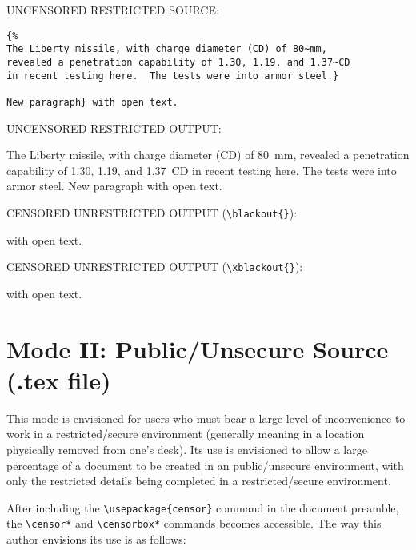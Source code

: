 \documentclass{article}
\begin{document}
{\addtolength{\leftskip}{2.3em}
UNCENSORED RESTRICTED SOURCE: \hrulefill


\verb|{%|\\
\verb|The Liberty missile, with charge diameter (CD) of 80~mm,|\\
\verb|revealed a penetration capability of 1.30, 1.19, and 1.37~CD|\\
\verb|in recent testing here.  The tests were into armor steel.}|\\
\verb| |\\
\verb|New paragraph} with open text.|

UNCENSORED RESTRICTED OUTPUT: \hrulefill

{%
The Liberty missile, with charge diameter (CD) of 
80~mm, revealed a penetration capability of 1.30, 1.19, and 
1.37~CD in recent testing here.  The tests were into armor steel.
\bpar
New paragraph} with open text.

CENSORED UNRESTRICTED OUTPUT (\verb|\blackout{}|): \hrulefill

 with open text.

CENSORED UNRESTRICTED OUTPUT (\verb|\xblackout{}|): \hrulefill

 with open text.

\hrulefill

}

\clearpage
\section{Mode II: Public/Unsecure Source (.tex file)}

This mode is envisioned for users who must bear a large level of
inconvenience to work in a restricted/secure environment (generally
meaning in a location physically removed from one's desk).  Its use is
envisioned to allow a large percentage of a document to be created in an
public/unsecure environment, with only the restricted details being
completed in a restricted/secure environment.

After including the \verb|\usepackage{censor}| command in the document
preamble, the \verb|\censor*| and \verb|\censorbox*| commands becomes
accessible.  The way this author envisions its use is as follows:
\end{document}
